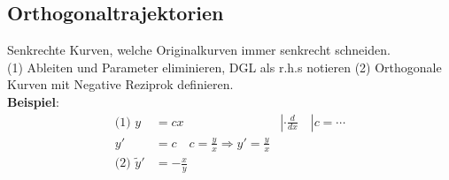 \subsection{Orthogonaltrajektorien}
Senkrechte Kurven, welche Originalkurven immer senkrecht schneiden. \\ 
(1) Ableiten und Parameter eliminieren, DGL als r.h.s notieren (2) Orthogonale Kurven mit Negative Reziprok definieren.\\
\noindent\textbf{Beispiel}:
\begin{align*}
	\text{(1) } y &= cx & | \cdot \frac{d}{dx}\quad | c=\cdots\\
	y' &= c \quad c = \frac{y}{x} \Rightarrow y' = \frac{y}{x}\\
	\text{(2) } \tilde{y}' &= -\frac{x}{y}
\end{align*}

